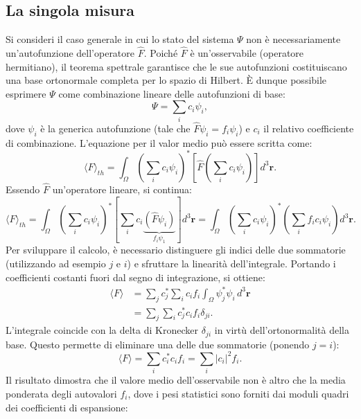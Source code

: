 \documentclass[a4paper,11pt]{report}
\begin{document}
\subsection{La singola misura}
Si consideri il caso generale in cui lo stato del sistema $\Psi$ non è necessariamente un'autofunzione dell'operatore $\hat{F}$.
Poiché $\hat{F}$ è un'osservabile (operatore hermitiano), il teorema spettrale garantisce che le sue autofunzioni costituiscano una base ortonormale completa per lo spazio di Hilbert. È dunque possibile esprimere $\Psi$ come combinazione lineare delle autofunzioni di base:
\begin{equation}
    \Psi = \sum_i c_i\psi_i,
\end{equation}
dove $\psi_i$ è la generica autofunzione (tale che $\hat{F}\psi_i = f_i \psi_i$) e $c_i$ il relativo coefficiente di combinazione. L'equazione per il valor medio può essere scritta come:
\begin{equation}
    \langle F \rangle_{th} = \int_\Omega \left(\sum_i c_i\psi_i \right)^* \left[\hat{F}\left(\sum_i c_i\psi_i \right)\right] d^3\bm{r}.
\end{equation}
Essendo $\hat{F}$ un'operatore lineare, si continua:
\begin{equation}
        \langle F \rangle_{th} = \int_\Omega \left(\sum_i c_i\psi_i \right)^* \left[\sum_i c_i \underbrace{(\hat{F}\psi_i)}_{f_i \psi_1} \right] d^3\bm{r} = \int_\Omega \left(\sum_i c_i\psi_i \right)^* \left(\sum_i f_ic_i\psi_i \right) d^3\bm{r}.
\end{equation}
Per sviluppare il calcolo, è necessario distinguere gli indici delle due sommatorie (utilizzando ad esempio $j$ e $i$) e sfruttare la linearità dell'integrale. Portando i coefficienti costanti fuori dal segno di integrazione, si ottiene:
\begin{equation}
\begin{aligned}
    \langle F \rangle &= \sum_j c_j^* \sum_i c_i f_i \int_\Omega \psi_j^* \psi_i \, d^3\bm{r} \\
    &= \sum_j \sum_i c_j^* c_i f_i {\delta_{ji}}.
\end{aligned}
\end{equation}
L'integrale coincide con la delta di Kronecker $\delta_{ji}$ in virtù dell'ortonormalità della base. Questo permette di eliminare una delle due sommatorie (ponendo $j=i$):
\begin{equation}
    \langle F \rangle = \sum_i c_i^* c_i f_i = \sum_i |c_i|^2 f_i.
\end{equation}
Il risultato dimostra che il valore medio dell'osservabile non è altro che la media ponderata degli autovalori $f_i$, dove i pesi statistici sono forniti dai moduli quadri dei coefficienti di espansione:
\end{document}
